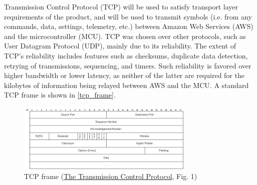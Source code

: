 \begin{flushleft}
    Transmission Control Protocol (TCP) will be used to satisfy transport layer
    requirements of the product, and will be used to transmit symbols (i.e.
    from any commands, data, settings, telemetry, etc.) between Amazon Web
    Services (AWS) and the microcontroller (MCU). TCP was chosen over other
    protocols, such as User Datagram Protocol (UDP), mainly due to its
    reliability. The extent of TCP's reliability includes features such as
    checksums, duplicate data detection, retrying of transmissions, sequencing,
    and timers.
    Such reliability is favored over higher bandwidth or lower
    latency, as neither of the latter are required for the kilobytes
    of information being relayed between AWS and the MCU. A standard TCP frame
    is shown in \autoref{tcp_frame}.
    \begin{figure}[H]
        \caption{TCP frame (\href{https://condor.depaul.edu/jkristof/technotes/tcp.html}{The Transmission Control Protocol}, Fig. 1)}
        \label{tcp_frame}
        \centering
        \includegraphics[width=0.75\textwidth]{images/tcp_frame.jpg}
    \end{figure}
\end{flushleft}